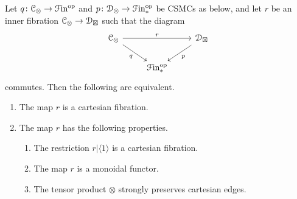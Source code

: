 \documentclass[main.tex]{subfiles}
\begin{document}
\begin{lemma}
  \label{lemma:equivalent_conditions_to_be_cartesan}
  Let $q\colon \mathcal{C}_{\otimes} \to \mathcal{F}\mathrm{in}^{\mathrm{op}}$ and $p\colon \mathcal{D}_{\otimes} \to \mathcal{F}\mathrm{in}_{*}^{\mathrm{op}}$ be CSMCs as below, and let $r$ be an inner fibration $\mathcal{C}_{\otimes} \to \mathcal{D}_{\boxtimes}$ such that the diagram
  \begin{equation*}
    \begin{tikzcd}
      \category{C}_{\otimes}
      \arrow[rr, "r"]
      \arrow[dr, swap, "q"]
      && \category{D}_{\boxtimes}
      \arrow[dl, "p"]
      \\
      & \Finp\op
    \end{tikzcd}
  \end{equation*}
  commutes. Then the following are equivalent.
  \begin{enumerate}
    \item The map $r$ is a cartesian fibration.

    \item The map $r$ has the following properties.
      \begin{enumerate}
        \item The restriction $r|\langle 1 \rangle$ is a cartesian fibration.

        \item The map $r$ is a monoidal functor.

        \item The tensor product $\otimes$ strongly preserves cartesian edges.
      \end{enumerate}
  \end{enumerate}
\end{lemma}
\end{document}
